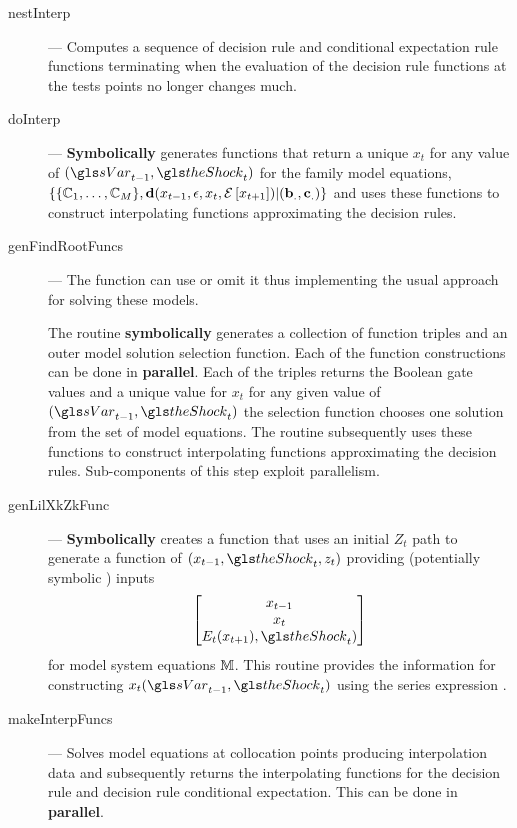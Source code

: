 \documentclass[12pt]{article}
\begin{document}
\begin{description}
\item[nestInterp] --- Computes a sequence of decision rule and conditional expectation rule functions terminating when the evaluation of the decision rule 
functions at the tests points no longer changes much.
\item[doInterp] --- {\bf Symbolically} generates functions that return a unique $x_t$ for any value of $\tArg$ for the family model equations, $\{\{\mathbb{C}_{1},\ldots,\mathbb{C}_{M}\},\mathbf{d}(x_{t-1},\epsilon,x_t,{\mathcal{E}\left [ x_{t+1} \right ]})|(\mathbf{b}_.,\mathbf{c}_.)\}$ and uses these functions to construct interpolating functions approximating the decision rules.
\item[genFindRootFuncs] --- 
The function can use  or omit it thus implementing the usual
approach for solving these models.

The routine {\bf symbolically} generates a collection of function triples
and an outer 
model solution selection function. 
Each of the function constructions can be done in {\bf parallel}.
Each of the triples
 returns the Boolean gate values and a unique value for 
$x_t$ for any given value of $\tArg$ the selection function chooses 
one solution from the set of  model equations. The routine
 subsequently uses these 
functions to construct interpolating functions approximating the 
decision rules. Sub-components of this step exploit parallelism.


\item[genLilXkZkFunc] --- {\bf Symbolically} creates a function that uses an initial $Z_t$ path to generate a function of $(x_{t-1},\theShock_t,z_t)$ providing (potentially symbolic ) inputs 
  \begin{gather*}
    \begin{bmatrix}
x_{t-1}\\x_t\\E_t(x_{t+1}),\theShock_t)    
    \end{bmatrix}
  \end{gather*}
 for model system equations $\mathbb{M}$.  This  routine  provides the 
information for constructing $x_t\tArg$ using the series expression .
\item[makeInterpFuncs] --- Solves model equations at collocation points 
producing interpolation data and subsequently returns the  
 interpolating functions for the decision rule and decision rule conditional expectation.  This can be done in {\bf parallel}.
\end{description}


\end{document}
